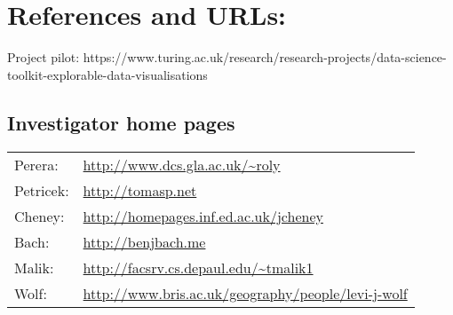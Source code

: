 \section*{References and URLs:}

Project pilot: https://www.turing.ac.uk/research/research-projects/data-science-toolkit-explorable-data-visualisations


\subsection*{Investigator home pages}
\begin{tabular}{ll}
  Perera:   & \url{http://www.dcs.gla.ac.uk/~roly} \\
  Petricek: & \url{http://tomasp.net} \\
  Cheney:   & \url{http://homepages.inf.ed.ac.uk/jcheney} \\
  Bach:     & \url{http://benjbach.me} \\
  Malik:    & \url{http://facsrv.cs.depaul.edu/~tmalik1} \\
  Wolf:     & \url{http://www.bris.ac.uk/geography/people/levi-j-wolf}
\end{tabular}
